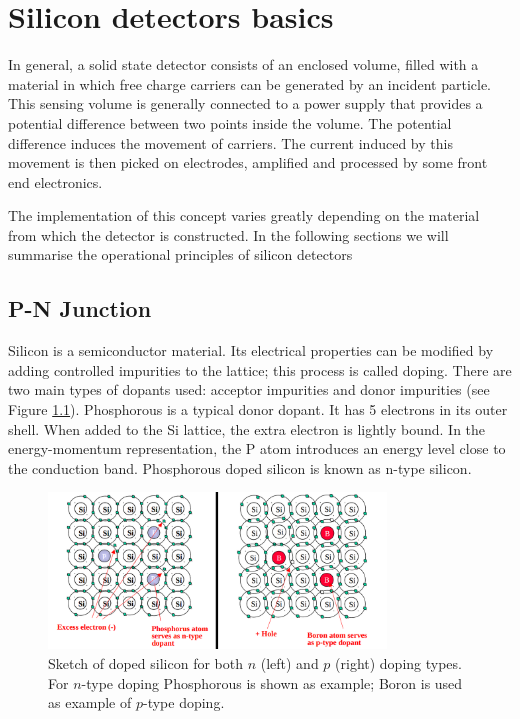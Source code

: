 \clearpage
{}  %
\chapter{Silicon detectors basics} %
\label{chap:detector}

In general, a solid state detector consists of an enclosed volume, filled with a material in
which free charge carriers can be generated by an incident particle. This sensing volume
is generally connected to a power supply that provides a  potential difference between two
points inside the volume. The potential difference induces the movement of 
carriers. The current induced by this movement is then picked on electrodes,
amplified and processed by some front end electronics.

The implementation of this concept varies greatly depending on the material from
which the detector is constructed. In the following sections we will summarise 
the operational principles of silicon detectors 

\section{P-N Junction}

Silicon is a semiconductor material. Its electrical properties can be modified
by adding controlled impurities to the lattice; this process is called doping.
There are two main types of dopants used: acceptor impurities and donor
impurities (see Figure \ref{fig:dopingSi}). Phosphorous is a typical donor dopant. It has 5 electrons in its
outer shell. When added to the Si lattice, the extra electron is lightly bound.
In the energy-momentum representation, the P atom introduces an energy level close to
the conduction band. Phosphorous doped silicon is known as n-type silicon. 

\begin{figure}[H]
	\centering
	\includegraphics[width=0.8\textwidth]{Dopants_Si.png}
	\caption{Sketch of doped silicon for both $n$ (left) and $p$ (right) doping types. For $n$-type doping Phosphorous is shown as example; Boron is used as example of $p$-type doping.}
	\label{fig:dopingSi}
\end{figure}

